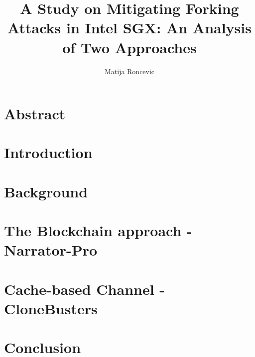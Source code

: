 \documentclass[sigconf]{acmart}
\title{A Study on Mitigating Forking Attacks in Intel SGX: An Analysis of Two Approaches}
\author{Matija Roncevic}
\affiliation{
    \institution{Friedricht-Alexander-Universität Erlangen-Nürnberg}
    \country{}
    \city{}}
\begin{document}
\maketitle  %




\section{Abstract}


\section{Introduction}


\section{Background}


\section{The Blockchain approach - Narrator-Pro}


\section{Cache-based Channel - CloneBusters}


\section{Conclusion}



\end{document}
